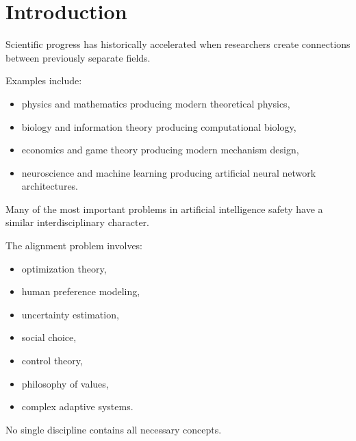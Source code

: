 \documentclass[11pt]{article}
\begin{document}
\section{Introduction}


Scientific progress has historically accelerated when researchers create
connections between previously separate fields.


Examples include:


\begin{itemize}

\item physics and mathematics producing modern theoretical physics,

\item biology and information theory producing computational biology,

\item economics and game theory producing modern mechanism design,

\item neuroscience and machine learning producing artificial neural
network architectures.

\end{itemize}



Many of the most important problems in artificial intelligence safety
have a similar interdisciplinary character.


The alignment problem involves:


\begin{itemize}

\item optimization theory,

\item human preference modeling,

\item uncertainty estimation,

\item social choice,

\item control theory,

\item philosophy of values,

\item complex adaptive systems.

\end{itemize}



No single discipline contains all necessary concepts.
\end{document}

